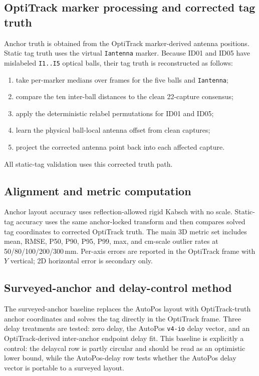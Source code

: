 \documentclass[11pt,a4paper]{article}
\begin{document}
\subsection{OptiTrack marker processing and corrected tag truth}
Anchor truth is obtained from the OptiTrack marker-derived antenna positions. Static tag
truth uses the virtual \texttt{Iantenna} marker. Because ID01 and ID05 have mislabeled
\texttt{I1..I5} optical balls, their tag truth is reconstructed as follows:
\begin{enumerate}[leftmargin=1.6em]
  \item take per-marker medians over frames for the five balls and \texttt{Iantenna};
  \item compare the ten inter-ball distances to the clean 22-capture consensus;
  \item apply the deterministic relabel permutations for ID01 and ID05;
  \item learn the physical ball-local antenna offset from clean captures;
  \item project the corrected antenna point back into each affected capture.
\end{enumerate}
All static-tag validation uses this corrected truth path.

\subsection{Alignment and metric computation}
Anchor layout accuracy uses reflection-allowed rigid Kabsch with no scale. Static-tag
accuracy uses the same anchor-locked transform and then compares solved tag coordinates to
corrected OptiTrack truth. The main 3D metric set includes mean, RMSE, P50, P90, P95, P99,
max, and cm-scale outlier rates at 50/80/100/200/300\,\si{\milli\meter}. Per-axis errors are
reported in the OptiTrack frame with $Y$ vertical; 2D horizontal error is secondary only.

\subsection{Surveyed-anchor and delay-control method}
The surveyed-anchor baseline replaces the AutoPos layout with OptiTrack-truth anchor
coordinates and solves the tag directly in the OptiTrack frame. Three delay treatments are
tested: zero delay, the AutoPos \texttt{v4-io} delay vector, and an OptiTrack-derived
inter-anchor endpoint delay fit. This baseline is explicitly a control: the delaycal row is
partly circular and should be read as an optimistic lower bound, while the AutoPos-delay row
tests whether the AutoPos delay vector is portable to a surveyed layout.
\end{document}
